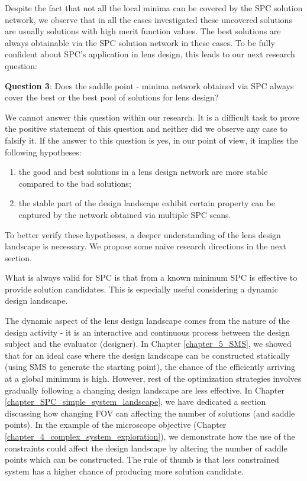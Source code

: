 Despite the fact that not all the local minima can be covered by the SPC solution network, we observe that in all the cases investigated these uncovered solutions are usually solutions with high merit function values. The best solutions are always obtainable via the SPC solution network in these cases. To be fully confident about SPC's application in lens design, this leads to our next research question:

\vspace{1em}

\textbf{Question 3}: Does the saddle point - minima network obtained via SPC always cover the best or the best pool of solutions for lens design? 

We cannot answer this question within our research. It is a difficult task to prove the positive statement of this question and neither did we observe any case to falsify it. If the answer to this question is yes, in our point of view, it implies the following hypotheses:
\vspace{-\topsep}
\begin{enumerate}[noitemsep]
\item the good and best solutions in a lens design network are more stable compared to the bad solutions;
\item the stable part of the design landscape exhibit certain property can be captured by the network obtained via multiple SPC scans.
\end{enumerate}
\vspace{-\topsep}

To better verify these hypotheses, a deeper understanding of the lens design landscape is necessary. We propose some naive research directions in the next section. 

\vspace{1em}

What is always valid for SPC is that from a known minimum SPC is effective to provide solution candidates. This is especially useful considering a dynamic design landscape. 

The dynamic aspect of the lens design landscape comes from the nature of the design activity - it is an interactive and continuous process between the design subject and the evaluator (designer). In Chapter \ref{chapter_5_SMS}, we showed that for an ideal case where the design landscape can be constructed statically (using SMS to generate the starting point), the chance of the efficiently arriving at a global minimum is high. However, rest of the optimization strategies involves gradually following a changing design landscape are less effective. In Chapter \ref{chapter_SPC_simple_system_landscape}, we have dedicated a section discussing how changing FOV can affecting the number of solutions (and saddle points). In the example of the microscope objective (Chapter \ref{chapter_4_complex_system_exploration}), we demonstrate how the use of the constraints could affect the design landscape by altering the number of saddle points which can be constructed. The rule of thumb is that less constrained system has a higher chance of producing more solution candidate. 

